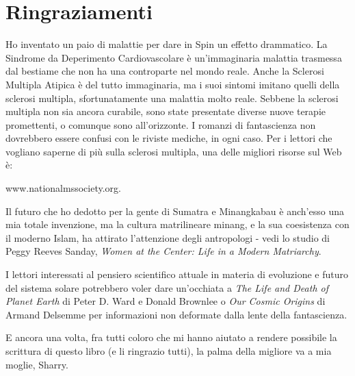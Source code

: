 \chapter{Ringraziamenti}\label{ringraziamenti}

\hfill\break

Ho inventato un paio di malattie per dare in Spin un effetto drammatico.
La Sindrome da Deperimento Cardiovascolare è un'immaginaria malattia
trasmessa dal bestiame che non ha una controparte nel mondo reale. Anche
la Sclerosi Multipla Atipica è del tutto immaginaria, ma i suoi sintomi
imitano quelli della sclerosi multipla, sfortunatamente una malattia
molto reale. Sebbene la sclerosi multipla non sia ancora curabile, sono
state presentate diverse nuove terapie promettenti, o comunque sono
all'orizzonte. I romanzi di fantascienza non dovrebbero essere confusi
con le riviste mediche, in ogni caso. Per i lettori che vogliano saperne
di più sulla sclerosi multipla, una delle migliori risorse sul Web è:

www.nationalmssociety.org.

Il futuro che ho dedotto per la gente di Sumatra e Minangkabau è
anch'esso una mia totale invenzione, ma la cultura matrilineare minang,
e la sua coesistenza con il moderno Islam, ha attirato l'attenzione
degli antropologi - vedi lo studio di Peggy Reeves Sanday, \emph{Women
	at the Center: Life in a Modern Matriarchy}.

I lettori interessati al pensiero scientifico attuale in materia di
evoluzione e futuro del sistema solare potrebbero voler dare un'occhiata
a \emph{The Life and Death of Planet Earth} di Peter D. Ward e Donald
Brownlee o \emph{Our Cosmic Origins} di Armand Delsemme per informazioni
non deformate dalla lente della fantascienza.

E ancora una volta, fra tutti coloro che mi hanno aiutato a rendere
possibile la scrittura di questo libro (e li ringrazio tutti), la palma
della migliore va a mia moglie, Sharry.
